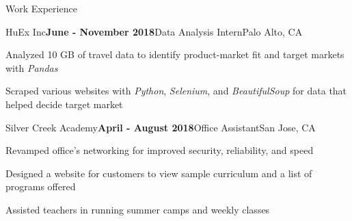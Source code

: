 \documentclass{resume} %
\begin{document}
\begin{rSection}{Work Experience}

	\begin{rSubsection}{HuEx Inc}{\textbf{June - November 2018}}{Data Analysis Intern}{Palo Alto, CA}
		\item Analyzed 10 GB of travel data to identify product-market fit and target markets with \textit{Pandas}
		\item Scraped various websites with \textit{Python}, \textit{Selenium}, and \textit{BeautifulSoup} for data that helped decide target market
	\end{rSubsection}

	\begin{rSubsection}{Silver Creek Academy}{\textbf{April - August 2018}}{Office Assistant}{San Jose, CA}
		\item Revamped office’s networking for improved security, reliability, and speed
		\item Designed a website for customers to view sample curriculum and a list of programs offered
		\item Assisted teachers in running summer camps and weekly classes 
	\end{rSubsection}
\end{rSection}
\end{document}

